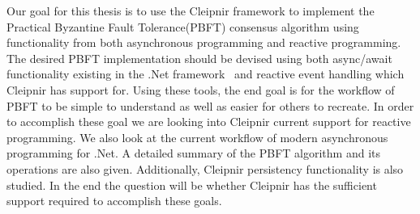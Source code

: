 Our goal for this thesis is to use the Cleipnir framework to implement the Practical Byzantine Fault Tolerance(PBFT) consensus algorithm using functionality from both asynchronous programming and reactive programming. The desired PBFT implementation should be devised using both async/await functionality existing in the .Net framework~\cite{DOC:AsyncAwait} and reactive event handling which Cleipnir has support for. Using these tools, the end goal is for the workflow of PBFT to be simple to understand as well as easier for others to recreate. In order to accomplish these goal we are looking into Cleipnir current support for reactive programming. We also look at the current workflow of modern asynchronous programming for .Net. A detailed summary of the PBFT algorithm and its operations are also given. Additionally, Cleipnir persistency functionality is also studied.
In the end the question will be whether Cleipnir has the sufficient support required to accomplish these goals.

